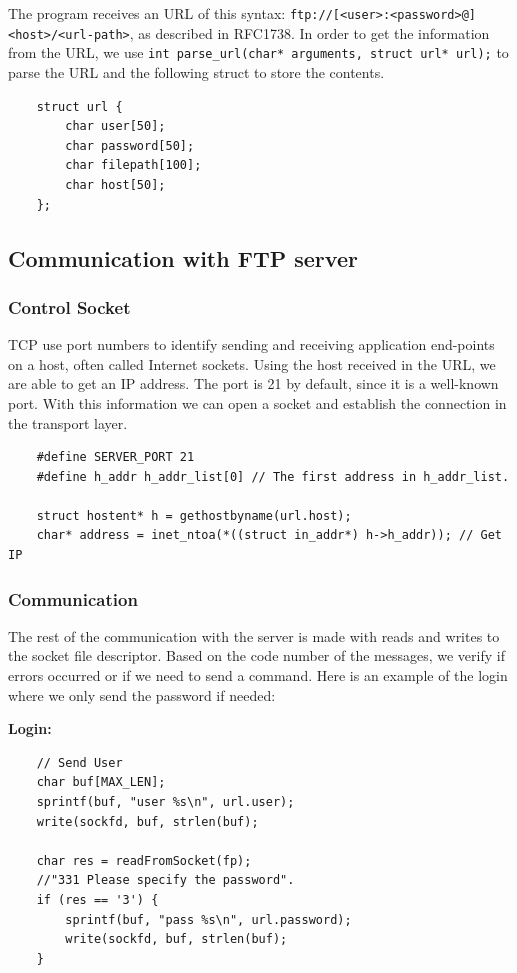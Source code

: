 \documentclass[11pt]{report}
\begin{document}
The program receives an URL of this syntax: \texttt{ftp://[<user>:<password>@]<host>/<url-path>}, as described in RFC1738.
In order to get the information from the URL, we use \texttt{int parse_url(char* arguments, struct url* url);} to parse the URL and the following struct to store the contents.

\begin{verbatim}
    struct url {
        char user[50];
        char password[50];
        char filepath[100];
        char host[50];
    };
\end{verbatim}

\subsection{Communication with FTP server}
\subsubsection{Control Socket}
TCP use port numbers to identify sending and receiving application end-points on a host, often called Internet sockets. Using the host received in the URL, we are able to get an IP address. The port is 21 by default, since it is a well-known port. With this information we can open a socket and establish the connection in the transport layer.

\begin{verbatim}
    #define SERVER_PORT 21
    #define h_addr h_addr_list[0] // The first address in h_addr_list.
    
    struct hostent* h = gethostbyname(url.host);
    char* address = inet_ntoa(*((struct in_addr*) h->h_addr)); // Get IP
\end{verbatim}

\newpage

\subsubsection{Communication}

The rest of the communication with the server is made with reads and writes to the socket file descriptor. Based on the code number of the messages, we verify if errors occurred or if we need to send a command. Here is an example of the login where we only send the password if needed: 

\textbf{Login:}
\begin{verbatim}
    // Send User
    char buf[MAX_LEN];
    sprintf(buf, "user %s\n", url.user);
    write(sockfd, buf, strlen(buf);
    
    char res = readFromSocket(fp);
    //"331 Please specify the password".
    if (res == '3') {
        sprintf(buf, "pass %s\n", url.password);
        write(sockfd, buf, strlen(buf);
    }
\end{verbatim}
\end{document}
